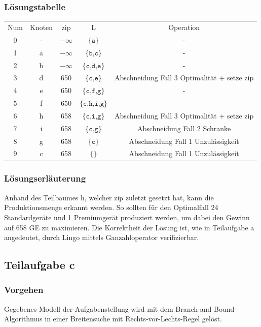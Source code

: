 \documentclass[a4paper,11pt]{article}
\begin{document}
\subsubsection*{Lösungstabelle}
    \begin{tabular}{ c c c c c }
        Num & Knoten & zip & L & Operation \\
        0 & - & $-\infty$ & $\texttt{\{a\}}$ & - \\
        1 & a & $-\infty$ & $\texttt{\{b,c\}}$ & - \\
        2 & b & $-\infty$ & $\texttt{\{c,d,e\}}$ & - \\
        3 & d & 650 & $\texttt{\{c,e\}}$ & Abschneidung Fall 3 Optimalität + setze zip \\
        4 & e & 650 & $\texttt{\{c,f,g\}}$ & - \\
        5 & f & 650 & $\texttt{\{c,h,i,g\}}$ & - \\
        6 & h & 658 & $\texttt{\{c,i,g\}}$  & Abschneidung Fall 3 Optimalität + setze zip \\
        7 & i & 658 & $\texttt{\{c,g\}}$ & Abschneidung Fall 2 Schranke \\
        8 & g & 658 & $\texttt{\{c\}}$ & Abschneidung Fall 1 Unzulässigkeit \\
        9 & c & 658 & $\texttt{\{\}}$ & Abschneidung Fall 1 Unzulässigkeit \\
    \end{tabular}

\subsubsection*{Lösungserläuterung}
Anhand des Teilbaumes h, welcher zip zuletzt gesetzt hat, kann die Produktionsmenge erkannt werden. So sollten für den Optimalfall 24 Standardgeräte und 1 Premiumgerät produziert werden, um dabei den Gewinn auf 658 GE zu maximieren. Die Korrektheit der Lösung ist, wie in Teilaufgabe a angedeutet, durch Lingo mittels Ganzahloperator verifizierbar.

\subsection*{Teilaufgabe c}
\subsubsection*{Vorgehen}
Gegebenes Modell der Aufgabenstellung wird mit dem Branch-and-Bound-Algorithmus in einer Breitensuche mit Rechts-vor-Lechts-Regel gelöst.
\end{document}
